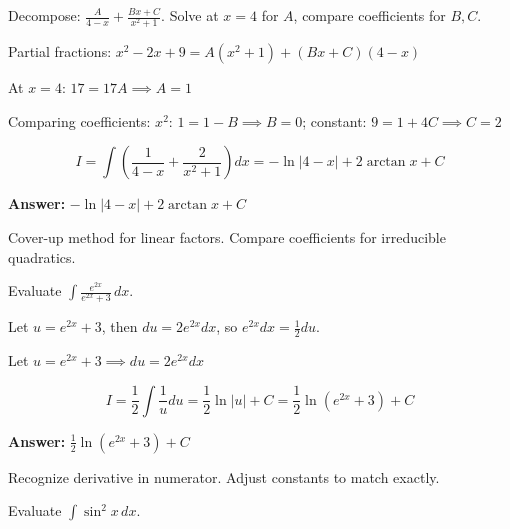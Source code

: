 \begin{hint}
Decompose: $\frac{A}{4-x} + \frac{Bx+C}{x^2+1}$. Solve at $x=4$ for $A$, compare coefficients for $B, C$.
\end{hint}

\begin{solution}
Partial fractions: $x^2-2x+9 = A(x^2+1) + (Bx+C)(4-x)$

At $x=4$: $17 = 17A \implies A=1$

Comparing coefficients: $x^2$: $1 = 1-B \implies B=0$; constant: $9 = 1+4C \implies C=2$

\[
I = \int \left(\frac{1}{4-x} + \frac{2}{x^2+1}\right) dx = -\ln|4-x| + 2\arctan x + C
\]

\textbf{Answer:} $\boxed{-\ln|4-x| + 2\arctan x + C}$
\end{solution}

\begin{takeaways}
Cover-up method for linear factors. Compare coefficients for irreducible quadratics.
\end{takeaways}

\vspace{1cm}

\begin{problem}
Evaluate $\displaystyle \int \frac{e^{2x}}{e^{2x} + 3} \, dx$.
\end{problem}

\begin{hint}
Let $u = e^{2x}+3$, then $du = 2e^{2x}dx$, so $e^{2x}dx = \frac{1}{2}du$.
\end{hint}

\begin{solution}
Let $u = e^{2x}+3 \implies du = 2e^{2x}dx$

\[
I = \frac{1}{2}\int \frac{1}{u} du = \frac{1}{2}\ln|u| + C = \frac{1}{2}\ln(e^{2x}+3) + C
\]

\textbf{Answer:} $\boxed{\frac{1}{2}\ln(e^{2x}+3) + C}$
\end{solution}

\begin{takeaways}
Recognize derivative in numerator. Adjust constants to match exactly.
\end{takeaways}

\vspace{1cm}

\begin{problem}
Evaluate $\displaystyle \int \sin^2 x \, dx$.
\end{problem}

